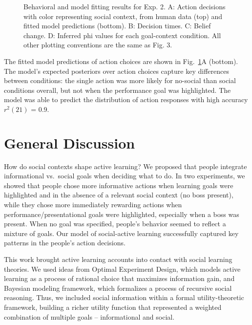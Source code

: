 \documentclass[10pt, letterpaper]{article}
\newenvironment{CodeChunk}{}{}
\begin{document}
\begin{CodeChunk}
\begin{figure}[H]
{}

\caption[Behavioral and model fitting results for Exp]{Behavioral and model fitting results for Exp. 2. A: Action decisions with color representing social context, from human data (top) and fitted model predictions (bottom). B: Decision times. C: Belief change. D: Inferred phi values for each goal-context condition. All other plotting conventions are the same as Fig. 3.}\label{fig:e2_results}
\end{figure}
\end{CodeChunk}

The fitted model predictions of action choices are shown in
Fig.~\ref{fig:e2_results}A (bottom). The model's expected posteriors
over action choices capture key differences between conditions: the
single action was more likely for no-social than social conditions
overall, but not when the performance goal was highlighted. The model
was able to predict the distribution of action responses with high
accuracy \(r^2(21)\) = 0.9.

\section{General Discussion}\label{general-discussion}

How do social contexts shape active learning? We proposed that people
integrate informational vs.~social goals when deciding what to do. In
two experiments, we showed that people chose more informative actions
when learning goals were highlighted and in the absence of a relevant
social context (no boss present), while they chose more immediately
rewarding actions when performance/presentational goals were
highlighted, especially when a boss was present. When no goal was
specified, people's behavior seemed to reflect a mixture of goals. Our
model of social-active learning successfully captured key patterns in
the people's action decisions.

This work brought active learning accounts into contact with social
learning theories. We used ideas from Optimal Experiment Design, which
models active learning as a process of rational choice that maximizes
information gain, and Bayesian modeling framework, which formalizes a
process of recursive social reasoning. Thus, we included social
information within a formal utility-theoretic framework, building a
richer utility function that represented a weighted combination of
multiple goals -- informational and social.
\end{document}
